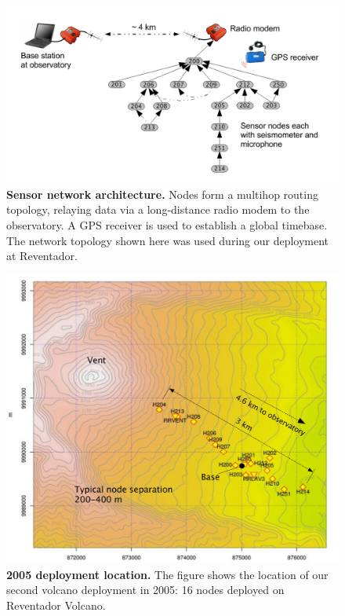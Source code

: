 \begin{figure}[t]
\begin{center}
\includegraphics[width=1.0\hsize]{./3-evaluation/figs/schematic.pdf}
\end{center}
\caption{\textbf{Sensor network architecture.} Nodes form a multihop routing
topology, relaying data via a long-distance radio modem to the observatory. A
GPS receiver is used to establish a global timebase. The network topology
shown here was used during our deployment at Reventador.}
\label{evaluation-fig-schematic}
\end{figure}

\begin{figure}[t]
\begin{center}
\includegraphics[width=0.8\hsize]{./3-evaluation/figs/map.pdf}
\end{center}
\caption{\textbf{2005 deployment location.} The figure shows the location of
our second volcano deployment in 2005: 16 nodes deployed on Reventador
Volcano.}
\label{evaluation-fig-map}
\end{figure}

